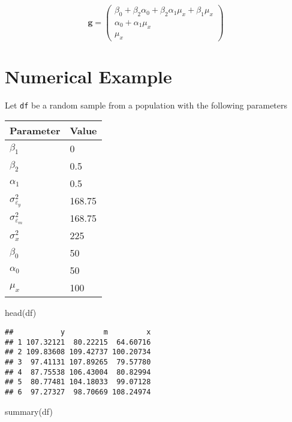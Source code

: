 \documentclass[
]{book}
\newenvironment{Shaded}{\begin{snugshade}}{\end{snugshade}}
\newcommand{\FunctionTok}[1]{\textcolor[rgb]{0.00,0.00,0.00}{#1}}
\newcommand{\NormalTok}[1]{#1}
\theoremstyle{definition}
\theoremstyle{definition}
\theoremstyle{definition}
\theoremstyle{remark}
\begin{document}
\begin{equation*}\mathbf{g} =\left( \begin{array}{c} \beta  _{0} + \beta  _{2} \alpha  _{0} + \beta  _{2} \alpha  _{1} \mu  _{x} + \beta  _{1} \mu  _{x} \\ \alpha  _{0} + \alpha  _{1} \mu  _{x} \\ \mu  _{x} \end{array} \right)\end{equation*}

\hypertarget{numerical-example-2}{%
\section{Numerical Example}\label{numerical-example-2}}

Let \texttt{df} be a random sample from a population with the following parameters

\begin{tabular}{l|l}
\hline
Parameter & Value\\
\hline
$\beta_1$ & 0\\
\hline
$\beta_2$ & 0.5\\
\hline
$\alpha_1$ & 0.5\\
\hline
$\sigma_{\varepsilon_y}^{2}$ & 168.75\\
\hline
$\sigma_{\varepsilon_m}^{2}$ & 168.75\\
\hline
$\sigma_{x}^{2}$ & 225\\
\hline
$\beta_0$ & 50\\
\hline
$\alpha_0$ & 50\\
\hline
$\mu_x$ & 100\\
\hline
\end{tabular}

\begin{Shaded}
\begin{Highlighting}[]
\FunctionTok{head}\NormalTok{(df)}
\end{Highlighting}
\end{Shaded}

\begin{verbatim}
##           y         m         x
## 1 107.32121  80.22215  64.60716
## 2 109.83608 109.42737 100.20734
## 3  97.41131 107.89265  79.57780
## 4  87.75538 106.43004  80.82994
## 5  80.77481 104.18033  99.07128
## 6  97.27327  98.70669 108.24974
\end{verbatim}

\begin{Shaded}
\begin{Highlighting}[]
\FunctionTok{summary}\NormalTok{(df)}
\end{Highlighting}
\end{Shaded}
\end{document}
